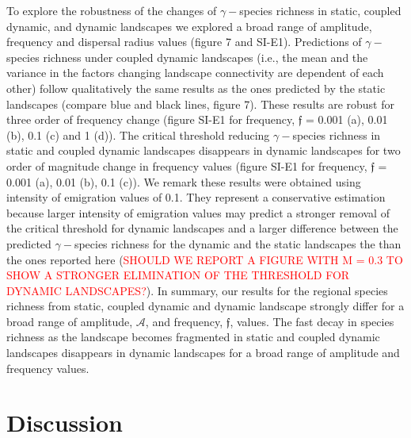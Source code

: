 \documentclass[12pt]{article}
\newcommand{\carlos}[1]{\textcolor{Red}{#1}}
\begin{document}
To explore the robustness of the changes of $\gamma-$species richness in static, coupled dynamic, and dynamic landscapes we explored a broad range of amplitude, frequency and dispersal radius values (figure 7 and SI-E1). Predictions of $\gamma-$species richness under coupled dynamic landscapes (i.e., the mean and the variance in the factors changing landscape connectivity are dependent of each other) follow qualitatively the same results as the ones predicted by the static landscapes (compare blue and black lines, figure 7). These results are robust for three order of frequency change (figure SI-E1 for frequency, $\mathfrak{f}$ = 0.001 (a), 0.01 (b), 0.1 (c) and 1 (d)). The critical threshold reducing $\gamma-$species richness in static and coupled dynamic landscapes disappears in dynamic landscapes for two order of magnitude change in frequency values (figure SI-E1 for frequency, $\mathfrak{f}$ = 0.001 (a), 0.01 (b), 0.1 (c)). We remark these results were obtained using intensity of emigration values of 0.1. They represent a conservative estimation because larger intensity of emigration values may predict a stronger removal of the critical threshold for dynamic landscapes and a larger difference between the predicted $\gamma-$species richness for the dynamic and the static landscapes the than the ones reported here (\carlos{SHOULD WE REPORT A FIGURE WITH M = 0.3 TO SHOW A STRONGER ELIMINATION OF THE THRESHOLD FOR DYNAMIC LANDSCAPES?}). In summary, our results for the regional species richness from static, coupled dynamic and dynamic landscape strongly differ for a broad range of amplitude, $\mathcal{A}$, and frequency, $\mathfrak{f}$, values. The fast decay in species richness as the landscape becomes fragmented in static and coupled dynamic landscapes disappears in dynamic landscapes for a broad range of amplitude and frequency values.

\section*{Discussion}
\end{document}
